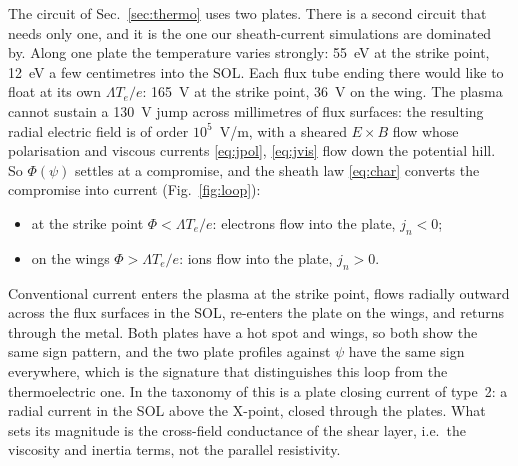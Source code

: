 \documentclass[11pt,a4paper]{article}
\newcommand{\Te}{T_e}
\begin{document}
The circuit of Sec.~\ref{sec:thermo} uses two plates. There is a second circuit that needs only one, and it is the one
our sheath-current simulations are dominated by. Along one plate the temperature varies strongly: 55~eV at the strike
point, 12~eV a few centimetres into the SOL. Each flux tube ending there would like to float at its own
$\Lambda\Te/e$: 165~V at the strike point, 36~V on the wing. The plasma cannot sustain a 130~V jump across millimetres
of flux surfaces: the resulting radial electric field is of order $10^5$~V/m, with a sheared $E\times B$ flow whose
polarisation and viscous currents \eqref{eq:jpol}, \eqref{eq:jvis} flow down the potential hill. So $\Phi(\psi)$ settles
at a compromise, and the sheath law \eqref{eq:char} converts the compromise into current (Fig.~\ref{fig:loop}):
\begin{itemize}
\item at the strike point $\Phi < \Lambda\Te/e$: electrons flow into the plate, $j_n < 0$;
\item on the wings $\Phi > \Lambda\Te/e$: ions flow into the plate, $j_n > 0$.
\end{itemize}
Conventional current enters the plasma at the strike point, flows radially outward across the flux surfaces in the
SOL, re-enters the plate on the wings, and returns through the metal. Both plates have a hot spot and wings, so both
show the same sign pattern, and the two plate profiles against $\psi$ have the same sign everywhere, which is the
signature that distinguishes this loop from the thermoelectric one. In the taxonomy of \cite{rozhansky2020} this is a
plate closing current of type~2: a radial current in the SOL above the X-point, closed through the plates. What sets
its magnitude is the cross-field conductance of the shear layer, i.e.\ the viscosity and inertia terms, not the
parallel resistivity.
\end{document}
